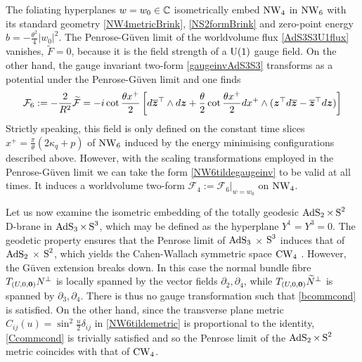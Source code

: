 The foliating hyperplanes $w=w_0\in\C$ isometrically embed $\NW_4$ in
$\NW_6$ with its standard geometry \eqref{NW4metricBrink}, \eqref{NS2formBrink}
and zero-point energy $b=-\frac{\theta^2}4|w_0|^2$. The Penrose-G\"uven limit of
the worldvolume flux \eqref{AdS3S3U1flux} vanishes, $\widetilde{F}=0$, because
it is the field strength of a ${\rm U}(1)$ gauge field. On the other hand, the
gauge invariant two-form \eqref{gaugeinvAdS3S3} transforms as a potential under
the Penrose-G\"uven limit and one finds
\begin{equation}
  \label{NW6tildegaugeinv}
  \mathcal{F}_6:=-\frac2{R^2}\widetilde{\mathcal{F}}
  =- i\cot\frac{\theta x^+}2\left[
    d\overline{\mz}^{\top}\wedge d\mz+\frac\theta2\cot\frac{\theta x^+}2
    dx^+\wedge(\mz^\top d\overline{\mz}-\overline{\mz}^{\top}d\mz)\right]
\end{equation}
Strictly speaking, this field is only defined on the constant time slices
$x^+=\frac\pi\theta(2\kappa_q+p)$ of $\NW_6$ induced by the energy minimising
configurations described above. However, with the scaling transformations
employed in the Penrose-G\"uven limit we can take the form
\eqref{NW6tildegaugeinv} to be valid at all times. It induces a worldvolume
two-form $\mathcal{F}_4:=\mathcal{F}_6|_{w=w_0}$ on $\NW_4$.

Let us now examine the isometric embedding of the totally geodesic
$\AdS_2\times\S^2$ D-brane in $\AdS_3\times\S^3$, which may be defined as the
hyperplane $Y^1=Y^3=0$. The geodetic property ensures that the Penrose limit of
$\AdS_3$ $\times$ $\S^3$ induces that of $\AdS_2$ $\times$ $\S^2$, which yields
the Cahen-Wallach symmetric space $\CW_4$ \cite{BFP1}. However, the G\"uven
extension breaks down. In this case the normal bundle fibre
$T_{(U,0,\mbf0)}N^\perp$ is locally spanned by the vector fields
$\partial_2,\partial_4$, while $T_{(U,0,\mbf0)}\widetilde{N}^{\perp}$ is spanned
by $\partial_3,\partial_4$. There is thus no gauge transformation such that
\eqref{bcommcond} is satisfied. On the other hand, since the transverse plane
metric $C_{ij}(u)=\sin^2\frac u2\delta_{ij}$ in \eqref{NW6tildemetric} is
proportional to the identity, \eqref{Ccommcond} is trivially satisfied and so
the Penrose limit of the $\AdS_2\times\S^2$ metric coincides with that of
$\CW_4$.

